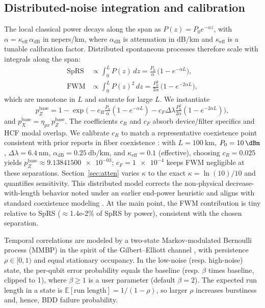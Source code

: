 \documentclass[conference]{IEEEtran}
\newcommand{\nexact}[1]{\num[round-mode=off]{#1}}
\newcommand{\simpcl}{10}
\newcommand{\simsep}{6.4}
\newcommand{\simpz}{9.13841500e-03}
\newcommand{\simFWMFrac}{1.4e-2\%}
\begin{document}
\subsection{Distributed-noise integration and calibration}\label{sec:calib}
The local classical power decays along the span as \(P(z)=P_0 e^{-\alpha z}\), with \(\alpha = \kappa_{\mathrm{eff}}\,\alpha_{\mathrm{dB}}\) in nepers/km, where \(\alpha_{\mathrm{dB}}\) is attenuation in dB/km and \(\kappa_{\mathrm{eff}}\) is a tunable calibration factor. Distributed spontaneous processes therefore scale with integrals along the span:
\begin{align}
\mathrm{SpRS} &\propto \int_0^L P(z)\,dz = \frac{P_0}{\alpha}\,\big(1-e^{-\alpha L}\big),\\
\mathrm{FWM} &\propto \int_0^L P(z)^2\,dz = \frac{P_0^2}{2\alpha}\,\big(1-e^{-2\alpha L}\big),
\end{align}
which are monotone in \(L\) and saturate for large \(L\). We instantiate
\begin{equation}
p_Z^{\text{base}} = 1-\exp\!\big(-c_R \tfrac{P_0}{\alpha}(1-e^{-\alpha L}) - c_F \Delta\lambda \tfrac{P_0^2}{2\alpha}(1-e^{-2\alpha L})\big),
\end{equation}
and \(p_X^{\text{base}}=\eta_{px}\,p_Z^{\text{base}}\). The coefficients \(c_R\) and \(c_F\) absorb device/filter specifics and HCF modal overlap. We calibrate \(c_R\) to match a representative coexistence point consistent with prior reports in fiber coexistence \cite{Patel2012PRX,Kumar2015NJP}: with \(L=\SI{100}{\kilo\meter}\), \(P_0=\SI{\simpcl}{\dBm}\), \(\Delta\lambda=\SI{\simsep}{\nano\meter}\), \(\alpha_{\mathrm{dB}}=\SI{0.25}{\decibel\per\kilo\meter}\), and \(\kappa_{\mathrm{eff}}=0.1\) (effective), choosing \(c_R=\num{0.025}\) yields \(p_Z^{\text{base}}\approx \nexact{\simpz}\); \(c_F=\num{1e-4}\) keeps FWM negligible at these separations. Section~\ref{sec:atten} varies \(\kappa\) to the exact \(\kappa=\ln(10)/10\) and quantifies sensitivity. This distributed model corrects the non-physical decrease-with-length behavior noted under an earlier end-power heuristic and aligns with standard coexistence modeling \cite{Patel2012PRX,Kumar2015NJP}. At the main point, the FWM contribution is tiny relative to SpRS (\(\approx\)\simFWMFrac{} of SpRS by power), consistent with the chosen separation.

Temporal correlations are modeled by a two-state Markov-modulated Bernoulli process (MMBP) in the spirit of the Gilbert--Elliott channel \cite{Gilbert1960BSTJ,Elliott1963BSTJ}, with persistence \(\rho\in[0,1)\) and equal stationary occupancy. In the low-noise (resp. high-noise) state, the per-qubit error probability equals the baseline (resp. \(\beta\) times baseline, clipped to 1), where \(\beta\ge1\) is a user parameter (default \(\beta=2\)). The expected run length in a state is \(\mathbb{E}[\text{run length}]=1/(1-\rho)\), so larger \(\rho\) increases burstiness and, hence, BDD failure probability.
\end{document}
